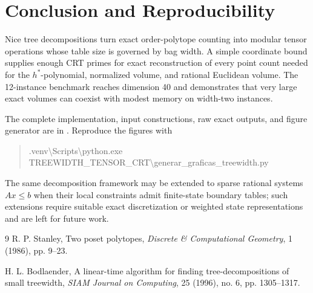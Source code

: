 \documentclass[10pt]{article}
\begin{document}
\section{Conclusion and Reproducibility}

Nice tree decompositions turn exact order-polytope counting into modular tensor operations whose table size is governed by bag width. A simple coordinate bound supplies enough CRT primes for exact reconstruction of every point count needed for the $h^*$-polynomial, normalized volume, and rational Euclidean volume. The 12-instance benchmark reaches dimension 40 and demonstrates that very large exact volumes can coexist with modest memory on width-two instances.

The complete implementation, input constructions, raw exact outputs, and figure generator are in . Reproduce the figures with
\begin{quote}
\small\ttfamily
.venv\textbackslash Scripts\textbackslash python.exe\\
TREEWIDTH\_TENSOR\_CRT\textbackslash generar\_graficas\_treewidth.py
\end{quote}
The same decomposition framework may be extended to sparse rational systems $Ax\leq b$ when their local constraints admit finite-state boundary tables; such extensions require suitable exact discretization or weighted state representations and are left for future work.

\begin{thebibliography}{9}
R. P. Stanley,
\newblock Two poset polytopes,
\newblock \emph{Discrete \& Computational Geometry}, 1 (1986), pp. 9--23.

H. L. Bodlaender,
\newblock A linear-time algorithm for finding tree-decompositions of small treewidth,
\newblock \emph{SIAM Journal on Computing}, 25 (1996), no. 6, pp. 1305--1317.
\end{thebibliography}
\end{document}
